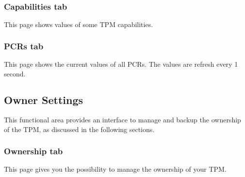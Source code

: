 \documentclass[
  american        %
]{sirrixreport}
\begin{document}
\subsubsection{Capabilities tab} This page shows values of some TPM capabilities.

\subsubsection{PCRs tab} This page shows the current values of all PCRs. The values are refresh every 1 second.

\subsection{Owner Settings} This functional area provides an interface to manage and backup the ownership of the TPM, as discussed in the following sections. 

\subsubsection{Ownership tab} This page gives you the possibility to manage the ownership of your TPM.
\end{document}
